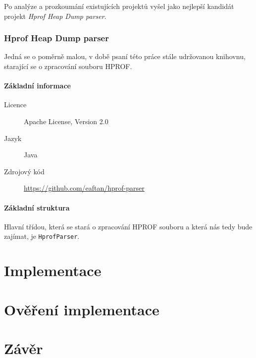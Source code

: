 Po analýze a prozkoumání existujících projektů vyšel jako nejlepší kandidát projekt \textit{Hprof Heap Dump parser}.

\subsection{Hprof Heap Dump parser}
Jedná se o poměrně malou, v době psaní této práce stále udržovanou knihovnu, starající se o zpracování souboru HPROF. 

\subsubsection{Základní informace}

\begin{description}
    \item[Licence] Apache License, Version 2.0
    \item[Jazyk] Java
    \item[Zdrojový kód] \url{https://github.com/eaftan/hprof-parser}
\end{description}

\subsubsection{Základní struktura}
Hlavní třídou, která se stará o zpracování HPROF souboru a která nás tedy bude zajímat, je \texttt{HprofParser}. 

\chapter{Implementace}
\chapter{Ověření implementace}
\chapter{Závěr}